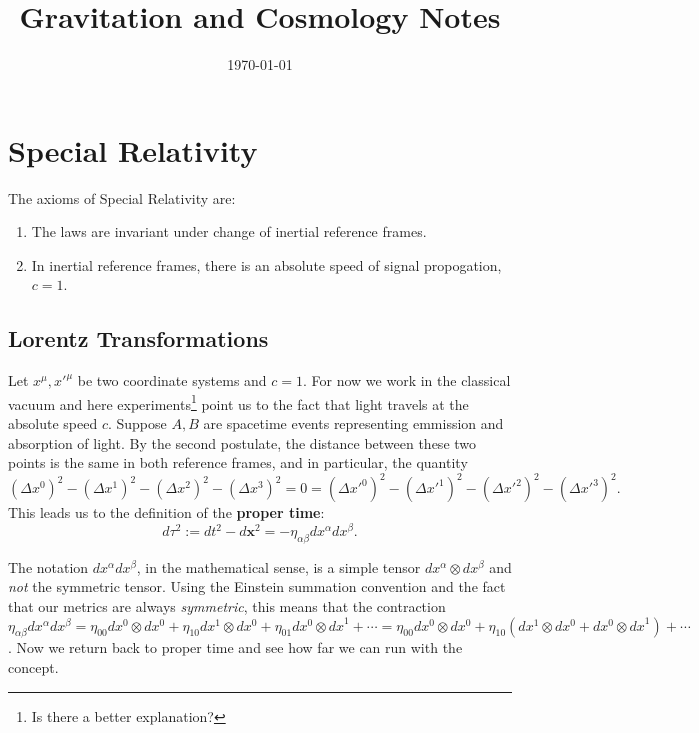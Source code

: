 \documentclass[11pt]{report}
\date{\today}
\title{Gravitation and Cosmology Notes}
\author{}
\newcommand{\ten}{\otimes}
\theoremstyle{plain}
\theoremstyle{definition}
\theoremstyle{remark}
\begin{document}
\maketitle

\chapter{Special Relativity}

The axioms of Special Relativity are:
\begin{enumerate}
\item The laws are invariant under change of inertial reference frames.
\item In inertial reference frames, there is an absolute speed of signal
propogation, $c=1$.
\end{enumerate}

\section{Lorentz Transformations}
Let $x^\mu,x'^\mu$ be two coordinate systems and $c=1$. For now we work in the
classical vacuum and here experiments\footnote{Is there a better explanation?}
point us to the fact that light travels at the absolute speed $c$.
Suppose $A,B$ are spacetime events representing emmission and absorption of
light. By the second postulate, the distance between these two points is the
same in both reference frames, and in particular, the quantity 
\[(\Delta x^0)^2-(\Delta x^1)^2-(\Delta x^2)^2-(\Delta x^3)^2 = 0 = (\Delta
x'^0)^2-(\Delta x'^1)^2-(\Delta x'^2)^2-(\Delta x'^3)^2.\]
This leads us to the definition of the \textbf{proper time}:
\[d\tau^2 := dt^2 - d\bm x^2 = -\eta_{\alpha\beta}dx^\alpha dx^\beta.\]

The notation $dx^\alpha dx^\beta$, in the mathematical sense, is a simple tensor
$dx^\alpha\ten dx^\beta$ and \emph{not} the symmetric tensor. Using the Einstein
summation convention and the fact that our metrics are always \emph{symmetric},
this means that the contraction $\eta_{\alpha\beta}dx^\alpha dx^\beta
=\eta_{00}dx^0\ten dx^0+\eta_{10}dx^1\ten dx^0+\eta_{01}dx^0\ten{dx}^1+\cdots
=\eta_{00}dx^0\ten dx^0+\eta_{10}(dx^1\ten dx^0+dx^0\ten{dx}^1)+\cdots$. Now we
return back to proper time and see how far we can run with the concept.
\end{document}
